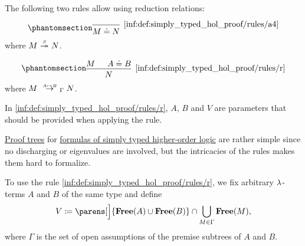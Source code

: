 \begin{definition}
\begin{thmenum}[series=def:simply_typed_hol_proof_tree]
\begin{thmenum}
       The following two rules allow using reduction relations:
      \begin{paracol}{2}
        \begin{leftcolumn}
          \ParacolAlignmentHack
          \begin{equation*}\taglabel[\ensuremath{ \logic{A}_4 }]{inf:def:simply_typed_hol_proof/rules/a4}
            \begin{prooftree}
              \infer0[\ref{inf:def:simply_typed_hol_proof/rules/a4}]{ M \syneq N },
            \end{prooftree}
          \end{equation*}
          where \( M \bred* N \).
        \end{leftcolumn}

        \begin{rightcolumn}
          \ParacolAlignmentHack
          \begin{equation*}\taglabel[\ensuremath{ \logic{R} }]{inf:def:simply_typed_hol_proof/rules/r}
            \begin{prooftree}
              \hypo{ M }
              \hypo{ A \syneq B }
              \infer2[\ref{inf:def:simply_typed_hol_proof/rules/r}]{ N },
            \end{prooftree}
          \end{equation*}
          where \( M \redrel{A \mapsto B}_\Gamma N \).
        \end{rightcolumn}
      \end{paracol}
    \end{thmenum}

    In \ref{inf:def:simply_typed_hol_proof/rules/r}, \( A \), \( B \) and \( V \) are parameters that should be provided when applying the rule.

     \hyperref[con:proof_tree]{Proof trees} for \hyperref[def:simply_typed_hol_formula]{formulas of simply typed higher-order logic} are rather simple since no discharging or eigenvalues are involved, but the intricacies of the rules makes them hard to formalize.

    To use the rule \ref{inf:def:simply_typed_hol_proof/rules/r}, we fix arbitrary \( {\mathrm \lambda} \)-terms \( A \) and \( B \) of the same type and define
    \begin{equation*}
      V \coloneqq \parens[\Big]{ \op*{Free}(A) \cup \op*{Free}(B) } \cap \bigcup_{M \in \Gamma} \op*{Free}(M),
    \end{equation*}
    where \( \Gamma \) is the set of open assumptions of the premise subtrees of \( A \) and \( B \).


\end{thmenum}
\end{definition}
